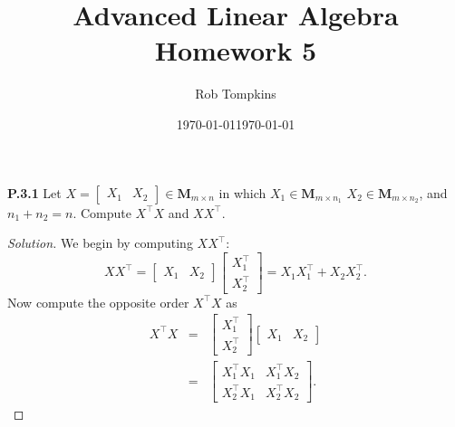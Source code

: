 \documentclass[12pt]{amsart}
\title{Advanced Linear Algebra\\Homework 5}
\author{Rob Tompkins}
\date{\today}
\newenvironment{solution}
{\begin{proof}[Solution]}
{\end{proof}}
\begin{document}
    \maketitle
    \date{\today}
    \begin{onehalfspace}

        \noindent\textbf{P.3.1} Let $X = [\begin{matrix}X_1 & X_2\end{matrix}]\in\mathbf{M}_{m\times n}$ in which $X_1 \in\mathbf{M}_{m\times n_1}$
        $X_2 \in\mathbf{M}_{m\times n_2}$, and $n_1 + n_2 = n$. Compute $X^\top X$ and $XX^\top$.
        \begin{solution}
            We begin by computing $X X^{\top}$:
            \begin{displaymath}
                X X^{\top} = \left[\begin{matrix}X_1 & X_2\end{matrix}\right] \left[\begin{matrix}X_1^\top \\ X_2^\top\end{matrix}\right] = X_1 X_1^{\top} + X_2 X_2^{\top}.
            \end{displaymath}
            Now compute the opposite order $X^\top X$ as
            \begin{eqnarray*}
                X^{\top} X & = & \left[\begin{matrix}X_1^\top \\ X_2^\top\end{matrix}\right] \left[\begin{matrix}X_1 & X_2\end{matrix}\right] \\
                 & = & \left[\begin{matrix}
                                 X_1^{\top} X_1 & X_1^{\top} X_2\\
                                 X_2^{\top} X_1 & X_2^{\top} X_2
                \end{matrix}\right].
            \end{eqnarray*}
        \end{solution}


\end{onehalfspace}
\end{document}

